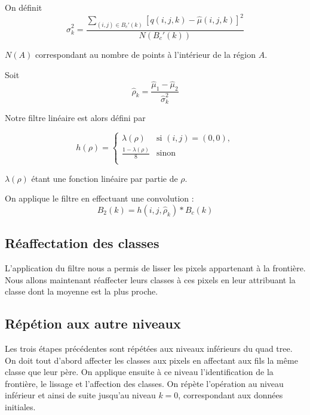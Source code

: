 	On définit \[ \hat{\sigma}_k^2 = \frac{\sum\limits_{(i,j) \in B_c'(k)}[q(i,j,k)-\hat{\mu}(i,j,k)]^2}{N(B_c'(k))} \]

	$N(A)$ correspondant au nombre de points à l'intérieur de la région $A$.

	Soit \[ \hat{\rho}_k = \frac{\hat{\mu}_1 - \hat{\mu}_2}{\hat{\sigma}_k^2} \]

	Notre filtre linéaire est alors défini par 

	\[ h(\rho) = \left\lbrace\begin{array}{cc}
		\lambda(\rho) & \mbox{si } (i,j) = (0,0), \\
		\frac{1 - \lambda(\rho)}{8} & \mbox{sinon}\\
	\end{array}\right.
	\]

	$\lambda(\rho)$ étant une fonction linéaire par partie de $\rho$.

	On applique le filtre en effectuant une convolution : 
	\[ B_2(k) = h(i,j,\hat{\rho}_k) * B_c(k) \] 

\subsection{Réaffectation des classes}
	L'application du filtre nous a permis de lisser les pixels appartenant à la frontière. Nous allons maintenant réaffecter leurs classes à ces pixels en leur attribuant la classe dont la moyenne est la plus proche.

\subsection{Répétion aux autre niveaux}
	Les trois étapes précédentes sont répétées aux niveaux inférieurs du quad tree. On doit tout d'abord affecter les classes aux pixels en affectant aux fils la même classe que leur père. On applique ensuite à ce niveau l'identification de la frontière, le lissage et l'affection des classes. On répète l'opération au niveau inférieur et ainsi de suite jusqu'au niveau $k=0$, correspondant aux données initiales. 